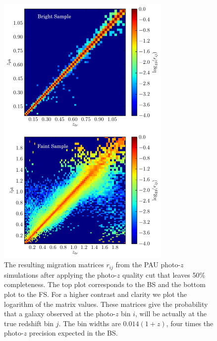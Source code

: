 \begin{figure}
\centering
\includegraphics[width=84mm]{./plots/rij_pau.pdf}
\caption{The resulting migration matrices $r_{ij}$ from the PAU photo-$z$ simulations after applying the photo-$z$ quality cut that leaves 50\% completeness. The top plot corresponds to the BS and the bottom plot to the FS. For a higher contrast and clarity we plot the logarithm of the matrix values. These matrices give the probability that a galaxy observed at the photo-$z$ bin $i$, will be actually at the true redshift bin $j$. The bin widths are $0.014(1+z)$, four times the photo-$z$ precision expected in the BS.}
\label{plot:rij}
\end{figure}

